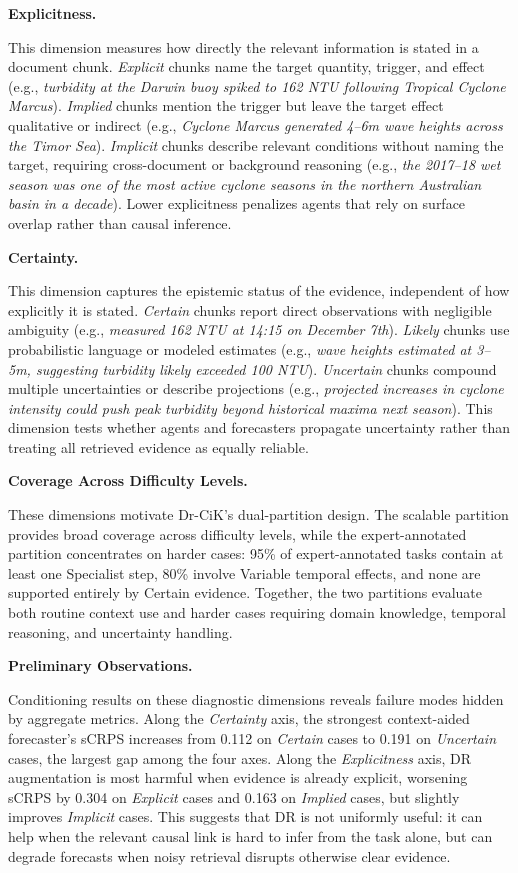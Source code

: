 \documentclass[]{servicenow}
\newcommand{\paragraphtight}[1]{%
  \par\vspace{-0.75\parskip}\vspace{0.3em}%
  \noindent\textbf{#1}\hspace{0.4em}\ignorespaces
}
\begin{document}
\paragraphtight{Explicitness.}
This dimension measures how directly the relevant information is stated in a document chunk. 
\emph{Explicit} chunks name the target quantity, trigger, and effect (e.g., \emph{turbidity at the Darwin buoy spiked to 162 NTU following Tropical Cyclone Marcus}). 
\emph{Implied} chunks mention the trigger but leave the target effect qualitative or indirect (e.g., \emph{Cyclone Marcus generated 4--6m wave heights across the Timor Sea}). 
\emph{Implicit} chunks describe relevant conditions without naming the target, requiring cross-document or background reasoning (e.g., \emph{the 2017--18 wet season was one of the most active cyclone seasons in the northern Australian basin in a decade}). 
Lower explicitness penalizes agents that rely on surface overlap rather than causal inference.

\paragraphtight{Certainty.}
This dimension captures the epistemic status of the evidence, independent of how explicitly it is stated. 
\emph{Certain} chunks report direct observations with negligible ambiguity (e.g., \emph{measured 162 NTU at 14:15 on December 7th}). 
\emph{Likely} chunks use probabilistic language or modeled estimates (e.g., \emph{wave heights estimated at 3--5m, suggesting turbidity likely exceeded 100 NTU}). 
\emph{Uncertain} chunks compound multiple uncertainties or describe projections (e.g., \emph{projected increases in cyclone intensity could push peak turbidity beyond historical maxima next season}). 
This dimension tests whether agents and forecasters propagate uncertainty rather than treating all retrieved evidence as equally reliable.

\paragraphtight{Coverage Across Difficulty Levels.}
These dimensions motivate Dr-CiK's dual-partition design. 
The scalable partition provides broad coverage across difficulty levels, while the expert-annotated partition concentrates on harder cases: 95\% of expert-annotated tasks contain at least one Specialist step, 80\% involve Variable temporal effects, and none are supported entirely by Certain evidence. 
Together, the two partitions evaluate both routine context use and harder cases requiring domain knowledge, temporal reasoning, and uncertainty handling.

\paragraphtight{Preliminary Observations.}
Conditioning results on these diagnostic dimensions reveals failure modes hidden by aggregate metrics. 
Along the \emph{Certainty} axis, the strongest context-aided forecaster's sCRPS increases from 0.112 on \emph{Certain} cases to 0.191 on \emph{Uncertain} cases, the largest gap among the four axes. 
Along the \emph{Explicitness} axis, DR augmentation is most harmful when evidence is already explicit, worsening sCRPS by 0.304 on \emph{Explicit} cases and 0.163 on \emph{Implied} cases, but slightly improves \emph{Implicit} cases. 
This suggests that DR is not uniformly useful: it can help when the relevant causal link is hard to infer from the task alone, but can degrade forecasts when noisy retrieval disrupts otherwise clear evidence.
\end{document}
